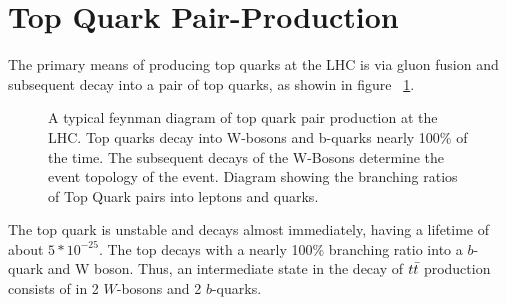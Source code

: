 \section{Top Quark Pair-Production}

The primary means of producing top quarks at the LHC is via gluon fusion and subsequent decay into a pair of top quarks, as showin in figure ~\ref{img:TopQuarkPairProduction}.

\begin{figure}
  \begin{center}

  \end{center}
  \caption{A typical feynman diagram of top quark pair production at the LHC.
    Top quarks decay into W-bosons and b-quarks nearly 100\% of the time.
    The subsequent decays of the W-Bosons determine the event topology of the \ttbar event.
    Diagram showing the branching ratios of Top Quark pairs into leptons and quarks.}
  \label{img:TopQuarkPairProduction}
\end{figure}
The top quark is unstable and decays almost immediately, having a lifetime of about $5*10^{-25}$\cite{PARTICLE_DATA_GROUP}.
The top decays with a nearly 100\% branching ratio into a $b$-quark and W boson.
Thus, an intermediate state in the decay of $t\bar{t}$ production consists of in 2 $W$-bosons and 2 $b$-quarks.

